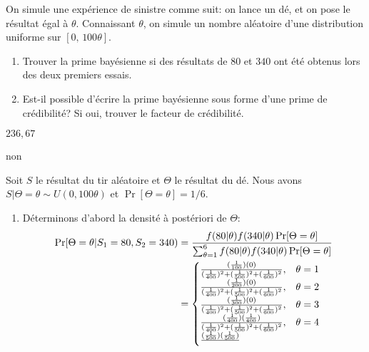\begin{exercice}
  On simule une expérience de sinistre comme suit: on lance un dé, et
  on pose le résultat égal à $\theta$. Connaissant $\theta$, on
  simule un nombre aléatoire d'une distribution uniforme sur $[0,\,
  100\theta]$.
  \begin{enumerate}
  \item Trouver la prime bayésienne si des résultats de $80$ et $340$
    ont été obtenus lors des deux premiers essais.
  \item Est-il possible d'écrire la prime bayésienne sous forme d'une
    prime de crédibilité? Si oui, trouver le facteur de crédibilité.
  \end{enumerate}
  \begin{rep}
    \begin{inparaenum}
    \item $236,67$
    \item non
    \end{inparaenum}
  \end{rep}
  \begin{sol}
    Soit $S$ le résultat du tir aléatoire et $\Theta$ le résultat du
    dé. Nous avons $S|\Theta = \theta \sim U(0, 100\theta)$ et
    $\Pr[\Theta = \theta] = 1/6$.
    \begin{enumerate}
    \item Déterminons d'abord la densité à postériori de $\Theta$:
      \begin{align*}
        \Pr[\Theta = \theta|S_1 = 80, S_2 = 340)
        &= \frac{
          f(80|\theta) f(340|\theta) \Pr[\Theta = \theta]}{%
          \sum_{\theta = 1}^6 f(80|\theta) f(340|\theta)
          \Pr[\Theta = \theta]} \\
        &=
        \begin{cases}
          \frac{(\frac{1}{100})(0)}{%
            (\frac{1}{400})^2 + (\frac{1}{500})^2 + (\frac{1}{600})^2},
          & \theta = 1 \\
          \frac{(\frac{1}{200})(0)}{%
            (\frac{1}{400})^2 + (\frac{1}{500})^2 + (\frac{1}{600})^2},
          & \theta = 2 \\
          \frac{(\frac{1}{300})(0)}{%
            (\frac{1}{400})^2 + (\frac{1}{500})^2 + (\frac{1}{600})^2},
          & \theta = 3 \\
          \frac{(\frac{1}{400})(\frac{1}{400})}{%
            (\frac{1}{400})^2 + (\frac{1}{500})^2 + (\frac{1}{600})^2},
          & \theta = 4 \\
          \frac{(\frac{1}{500})(\frac{1}{500})}{%
}
\end{cases}
\end{align*}
\end{enumerate}
\end{sol}
\end{exercice}
